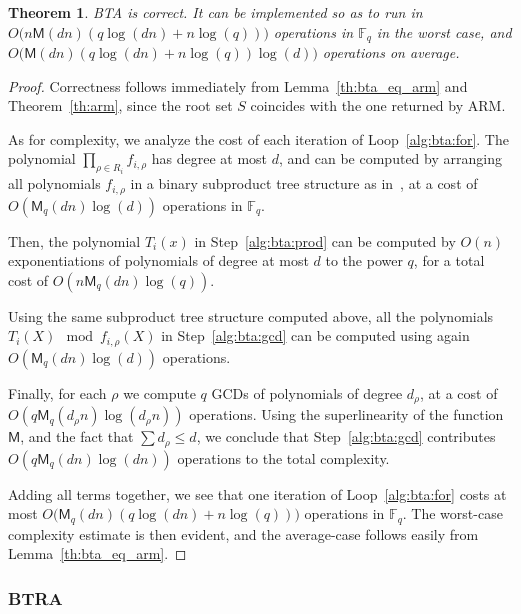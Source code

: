 \documentclass{article}
\newcommand{\ff}[1]{\mathbb{F}_{#1}}
\newcommand{\qq}{q}
\newcommand{\basef}{\ff{\qq}}
\newcommand{\Mul}{\mathsf{M}}
\newtheorem{Theo}{Theorem}
\newcommand{\Notes}[1]{\textcolor{red}{Note: #1}}
\begin{document}
\begin{Theo}
  BTA is correct. It can be implemented so as to run in
  $O\bigl(n\Mul(dn)(q\log(dn) + n\log(q))\bigr)$ operations in
  $\basef$ in the worst case, and
  $O\bigl(\Mul(dn)(q\log(dn) + n\log(q))\log(d)\bigr)$ operations on
  average.
\end{Theo}
\begin{proof}
  Correctness follows immediately from Lemma~\ref{th:bta_eq_arm} and
  Theorem~\ref{th:arm}, since the root set $S$ coincides with the one
  returned by ARM.

  As for complexity, we analyze the cost of each iteration of
  Loop~\ref{alg:bta:for}. The polynomial
  $\prod_{\rho\in R_i}f_{i,\rho}$ has degree at most $d$, and can be
  computed by arranging all polynomials $f_{i,\rho}$ in a binary
  subproduct tree structure as in~\cite[Lemma~10.4]{Gathen2003}, at a
  cost of $O(\Mul_q(dn)\log(d))$ operations in $\basef$.
  
  Then, the polynomial $T_i(x)$ in Step~\ref{alg:bta:prod} can be
  computed by $O(n)$ exponentiations of polynomials of degree at most
  $d$ to the power $q$, for a total cost of $O(n\Mul_q(dn)\log(q))$.

  Using the same subproduct tree structure computed above, all the
  polynomials $T_i(X)\mod f_{i,\rho}(X)$ in Step~\ref{alg:bta:gcd} can
  be computed using again $O(\Mul_q(dn)\log(d))$ operations. 

  Finally, for each $\rho$ we compute $q$ GCDs of polynomials of
  degree $d_\rho$, at a cost of $O(q\Mul_q(d_\rho n)\log(d_\rho n))$
  operations. Using the superlinearity of the function $\Mul$, and the
  fact that $\sum d_\rho \le d$, we conclude that
  Step~\ref{alg:bta:gcd} contributes $O(q\Mul_q(dn)\log(dn))$
  operations to the total complexity.
  
  Adding all terms together, we see that one iteration of
  Loop~\ref{alg:bta:for} costs at most
  $O\bigl(\Mul_q(dn)(q\log(dn) + n\log(q))\bigr)$ operations in
  $\basef$. The worst-case complexity estimate is then evident, and
  the average-case follows easily from Lemma~\ref{th:bta_eq_arm}.
\end{proof}



\subsubsection{BTRA}
\end{document}

